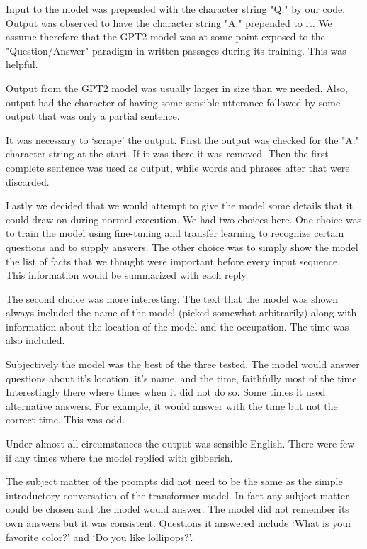 Input to the model was prepended with the character string "Q:" by our code. Output was observed 
to have the character string "A:" prepended to it. We assume therefore that the GPT2 model was at some point
exposed to the "Question/Answer" paradigm in written passages during its training. This was helpful.

Output from the GPT2 model was 
usually larger in size than we needed. Also, output had the character of having some sensible utterance followed by some output that was only a partial sentence.

It was necessary to `scrape' the output. First the output was checked for the "A:" character string at the start. If it was there it was removed. Then the first complete sentence was used as output, while words and phrases after that were discarded.

Lastly we decided that we would attempt to give the model some details that it could draw on 
during normal execution. We had two choices here. One choice was to train the model using fine-tuning and transfer learning to recognize certain questions and to supply answers. The other
choice was to simply show the model the list of facts that we thought were important before 
every input sequence. This information would be summarized with each reply.

The second choice was more interesting. The text that the model was shown always included the name of 
the model (picked somewhat arbitrarily) along with information about the location of the model
and the occupation. The time was also included.

Subjectively the model was the best of the three tested. The model would answer questions about it's location, it's name, and the time, faithfully most
of the time. Interestingly there where times when it did not do so. Some times it used 
alternative answers. For example, it would answer with the time but not the correct time. This was odd.

Under almost all circumstances the output was sensible English. There were few if any times where the model replied with gibberish. 

The subject matter of the prompts did not need to be the same as the simple introductory conversation of the transformer model. In fact any subject matter could be chosen and the model would answer. The model did not remember its own answers but it was consistent. Questions it answered include `What is your favorite color?' and `Do you like lollipops?'. 

